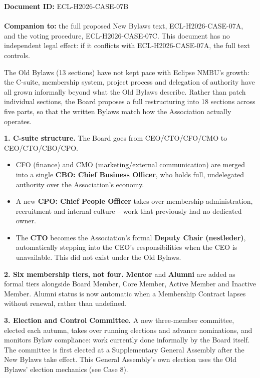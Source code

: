 \documentclass{../../../Common/Latex/Templates/rapport}
\date{\meetingdate, \meetingtime}
\begin{document}
\makecoverpage
\tableofcontents
\reportmainmatter

\noindent\textbf{Document ID:} ECL-H2026-CASE-07B\\
\meetingline\\
\textbf{Companion to:} the full proposed New Bylaws text, ECL-H2026-CASE-07A, and the voting procedure, ECL-H2026-CASE-07C. This document has no independent legal effect: if it conflicts with ECL-H2026-CASE-07A, the full text controls.

The Old Bylaws (13 sections) have not kept pace with Eclipse NMBU's growth: the C-suite, membership system, project process and delegation of authority have all grown informally beyond what the Old Bylaws describe. Rather than patch individual sections, the Board proposes a full restructuring into 18 sections across five parts, so that the written Bylaws match how the Association actually operates.


\textbf{1. C-suite structure.} The Board goes from CEO/CTO/CFO/CMO to CEO/CTO/CBO/CPO.
\begin{itemize}
  \item CFO (finance) and CMO (marketing/external communication) are merged into a single \textbf{CBO: Chief Business Officer}, who holds full, undelegated authority over the Association's economy.
  \item A new \textbf{CPO: Chief People Officer} takes over membership administration, recruitment and internal culture -- work that previously had no dedicated owner.
  \item The \textbf{CTO} becomes the Association's formal \textbf{Deputy Chair (nestleder)}, automatically stepping into the CEO's responsibilities when the CEO is unavailable. This did not exist under the Old Bylaws.
\end{itemize}

\textbf{2. Six membership tiers, not four.} \textbf{Mentor} and \textbf{Alumni} are added as formal tiers alongside Board Member, Core Member, Active Member and Inactive Member. Alumni status is now automatic when a Membership Contract lapses without renewal, rather than undefined.

\textbf{3. Election and Control Committee.} A new three-member committee, elected each autumn, takes over running elections and advance nominations, and monitors Bylaw compliance: work currently done informally by the Board itself. The committee is first elected at a Supplementary General Assembly after the New Bylaws take effect. This General Assembly's own election uses the Old Bylaws' election mechanics (see Case 8).
\end{document}
